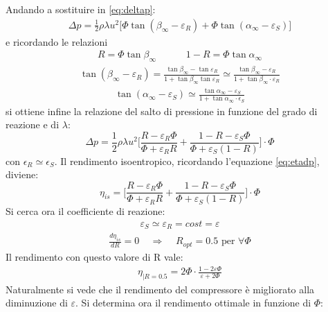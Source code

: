 Andando a sostituire in \ref{eq:deltap}:
\begin{align*}
\Delta p = \frac{1}{2} \rho \lambda u^2 \big[ \Phi \tan \left( \beta_{\infty} - \varepsilon_R \right) + \Phi \tan \left( \alpha_{\infty} - \varepsilon_S \right) \big] 
\end{align*}
e ricordando le relazioni
\begin{align*}
R = \Phi \tan \beta_{\infty} \;\;\;\;\;\;\;\;\;\;\; 1 - R = \Phi \tan \alpha_{\infty} 
\end{align*}
\begin{align*}
\tan ( \beta_{\infty} - \varepsilon_R ) = \frac{\tan \beta_{\infty} - \tan \varepsilon_R}{1 + \tan \beta_{\infty} \tan \varepsilon_R} \simeq \frac{\tan \beta_{\infty} - \varepsilon_R}{1 + \tan \beta_{\infty} \cdot \varepsilon_R}
\end{align*}
\begin{align*}
\tan (\alpha_{\infty} - \varepsilon_S) \simeq \frac{\tan \alpha_{\infty} - \varepsilon_S}{1 + \tan \alpha_{\infty} \cdot \epsilon_S}
\end{align*}
si ottiene infine la relazione del salto di pressione in funzione del grado di reazione e di $\lambda$:
\begin{equation}
\Delta p = \frac{1}{2} \rho \lambda u^2 \Bigg[ \frac{R - \varepsilon_R \Phi}{\Phi + \varepsilon_R R} + \frac{1 - R - \varepsilon_S \Phi}{\Phi + \varepsilon_S (1-R)} \Bigg] \cdot \Phi
\end{equation}
con $\epsilon_R \simeq \epsilon_S$. Il rendimento isoentropico, ricordando l'equazione \ref{eq:etadp}, diviene:
\begin{equation}
\boxed{ \eta_{is} = \Bigg[ \frac{R - \varepsilon_R \Phi}{\Phi + \varepsilon_R R} + \frac{1 - R - \varepsilon_S \Phi}{\Phi + \varepsilon_S (1-R)} \Bigg] \cdot \Phi }
\end{equation}
Si cerca ora il coefficiente di reazione:
\begin{align*}
\varepsilon_S \simeq \varepsilon_R = cost = \varepsilon
\end{align*}
\begin{align*}
\frac{d \eta_{is}}{dR} = 0 \;\;\;\; \Rightarrow  \;\;\;\; R_{opt} = 0.5 \mbox{ per } \forall \Phi
\end{align*}
Il rendimento con questo valore di R vale:
\begin{align*}
\eta_{|R= 0.5} = 2 \Phi \cdot \frac{1- 2 \varepsilon \Phi}{\varepsilon + 2 \Phi}
\end{align*}
Naturalmente si vede che il rendimento del compressore è migliorato alla diminuzione di $\varepsilon$. Si determina ora il rendimento ottimale in funzione di $\Phi$:
